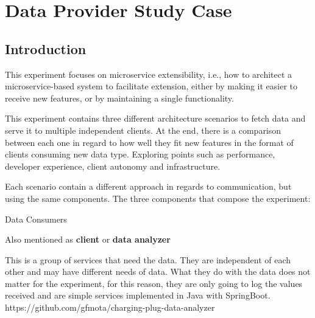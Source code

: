 

\newcommand{\sla}{\textbackslash}

\newcommand{\cmd}[1]{\textsf{#1}}

\newcommand{\pkg}[1]{\textsf{#1}}

\newcommand{\ltxcmd}[1]{\cmd{\sla{}#1}}

\chapter{Data Provider Study Case}
\label{chap:dataprovider}

\section{Introduction}
\label{sec:introduction}

This experiment focuses on microservice extensibility, i.e., how to architect a microservice-based system to facilitate extension, either by making it easier to receive new features, or by maintaining a single functionality. 

This experiment contains three different architecture scenarios to fetch data and serve it to multiple independent clients. At the end, there is a comparison between each one in regard to how well they fit new features in the format of clients consuming new data type. Exploring points such as performance, developer experience, client autonomy and infrastructure.

Each scenario contain a different approach in regards to communication, but using the same components. The three components that compose the experiment:

{Data Consumers}
\label{sec:dataconsumer}

Also mentioned as \textbf{client} or \textbf{data analyzer}

This is a group of services that need the data. They are independent of each other and may have different needs of data. What they do with the data does not matter for the experiment, for this reason, they are only going to log the values received and are simple services implemented in Java with SpringBoot. https://github.com/gfmota/charging-plug-data-analyzer

